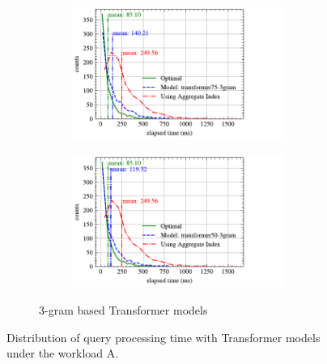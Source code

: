 \begin{figure}[p]
\begin{subfigure}{0.45\textwidth}
\begin{subfigure}{\textwidth}
			\includegraphics[]{my/graphics/perf_dist_transformer75_3gram_A.pdf}
		\end{subfigure}
		\vfill
		\begin{subfigure}{\textwidth}
			\centering
			\includegraphics[]{my/graphics/perf_dist_transformer50_3gram_A.pdf}
		\end{subfigure}
		\caption{3-gram based Transformer models}
	\end{subfigure}
	\caption{Distribution of query processing time with Transformer models under the workload A.}
	\label{fig:transformer_perf_all_A}
\end{figure}
